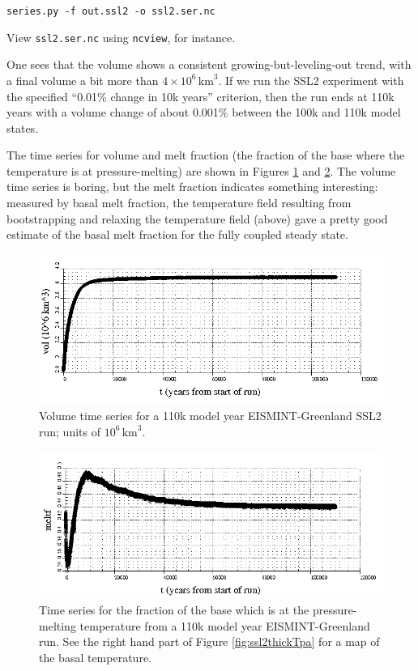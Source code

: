 \documentclass[11pt,final]{amsart}
\begin{document}
\verb|series.py -f out.ssl2 -o ssl2.ser.nc|

\noindent View \verb|ssl2.ser.nc| using \verb|ncview|, for instance.

One sees that the volume shows a consistent growing-but-leveling-out trend, with a final volume a bit more than $4 \times 10^{6}\,\text{km}^3$.  If we run the SSL2 experiment with the specified ``0.01\% change in 10k years'' criterion, then the run ends at 110k years with a volume change of about 0.001\% between the 100k and 110k model states.

The time series for volume and melt fraction (the fraction of the base where the temperature is at pressure-melting) are shown in Figures \ref{fig:eisgrnvolseries} and \ref{fig:eisgrnmeltfseries}.  The volume time series is boring, but the melt fraction indicates something interesting: measured by basal melt fraction, the temperature field resulting from bootstrapping and relaxing the temperature field (above) gave a pretty good estimate of the basal melt fraction for the fully coupled steady state.

\begin{figure}[ht]
\includegraphics[width=6.0in,keepaspectratio=true]{eisgrn_volseries}
\caption{Volume time series for a 110k model year EISMINT-Greenland SSL2 run; units of $10^{6}\,\text{km}^3$.}
\label{fig:eisgrnvolseries}
\end{figure}

\begin{figure}[ht]
\includegraphics[width=6.0in,keepaspectratio=true]{eisgrn_meltfseries}
\caption{Time series for the fraction of the base which is at the pressure-melting temperature from a 110k model year EISMINT-Greenland run.  See the right hand part of Figure \ref{fig:ssl2thickTpa} for a map of the basal temperature.}
\label{fig:eisgrnmeltfseries}
\end{figure}
\end{document}

